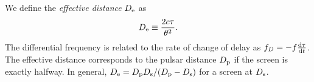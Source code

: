 \documentclass[useAMS,usenatbib]{mn2e}
\begin{document}



We define the {\it effective distance} $D_{\rm e}$ as
\begin{equation}
D_{\rm e} \equiv \frac{2c\tau}{\theta^2}.
\end{equation}
The differential frequency is related to the rate of change of delay
as $f_D  =-f\frac{\rm d\tau}{\operatorname{d \!} t}$.  The effective distance
corresponds to the pulsar distance $D_{\rm p}$ if the screen is exactly halfway.
In general, $D_{\rm e}={D_{\rm p} D_{\rm s}}/({D_{\rm p} - D_{\rm
    s}})$ for a screen at $D_{\rm s}$.


\end{document}

